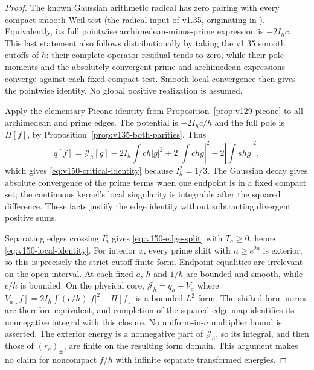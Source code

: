 \documentclass[11pt]{article}
\theoremstyle{remark}
\begin{document}
\begin{proof}
The known Gaussian arithmetic radical has zero pairing with every
compact smooth Weil test (the radical input of v1.35, originating in
\cite[Section~3]{ConnesConsani2023}). Equivalently, its full pointwise
archimedean-minus-prime expression is $-2I_hc$. This last statement
also follows distributionally by taking the v1.35 smooth cutoffs of
$h$: their complete operator residual tends to zero, while their pole
moments and the absolutely convergent prime and archimedean expressions
converge against each fixed compact test. Smooth local convergence then
gives the pointwise identity. No global positive realization is assumed.

Apply the elementary Picone identity from
Proposition~\ref{prop:v129-picone} to all archimedean and prime edges.
The potential is $-2I_hc/h$ and the full pole is $\Pi[f]$, by
Proposition~\ref{prop:v135-both-parities}. Thus
\[
 q[f]=\mathcal J_h[g]-2I_h\int ch|g|^2
               +2\left|\int chg\right|^2-2\left|\int shg\right|^2,
\]
which gives \eqref{eq:v150-critical-identity} because $I_h^2=1/3$.
The Gaussian decay gives absolute convergence of the prime terms when
one endpoint is in a fixed compact set; the continuous kernel's local
singularity is integrable after the squared difference. These facts
justify the edge identity without subtracting divergent positive sums.

Separating edges crossing $I_a^c$ gives \eqref{eq:v150-edge-split}
with $T_a\ge0$, hence \eqref{eq:v150-local-identity}.
For interior $x$, every prime shift with $n\ge e^{2a}$ is exterior,
so this is precisely the strict-cutoff finite form. Endpoint equalities
are irrelevant on the open interval. At each fixed $a$, $h$ and $1/h$
are bounded and smooth, while $c/h$ is bounded. On the physical core,
$\mathcal J_h=q_a+V_a$ where
$V_a[f]=2I_h\int(c/h)|f|^2-\Pi[f]$ is a bounded $L^2$ form.
The shifted form norms are therefore equivalent, and completion of the
squared-edge map identifies its nonnegative integral with this closure.
No uniform-in-$a$ multiplier bound is asserted. The exterior energy is
a nonnegative part of $\mathcal J_h$, so its integral, and then those
of $(r_a)_\pm$, are finite on the resulting form domain. This argument makes no
claim for noncompact $f/h$ with infinite separate transformed energies.
\end{proof}
\end{document}
